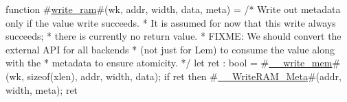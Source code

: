 function #\hyperref[sailRISCVzwritezyram]{write\_ram}#(wk, addr, width, data, meta) = {
  /* Write out metadata only if the value write succeeds.
   * It is assumed for now that this write always succeeds;
   * there is currently no return value.
   * FIXME: We should convert the external API for all backends
   * (not just for Lem) to consume the value along with the
   * metadata to ensure atomicity.
   */
  let ret : bool = #\hyperref[sailRISCVzzyzywritezymem]{\_\_write\_mem}#(wk, sizeof(xlen), addr, width, data);
  if ret then #\hyperref[sailRISCVzzyzyWriteRAMzyMeta]{\_\_WriteRAM\_Meta}#(addr, width, meta);
  ret
}
